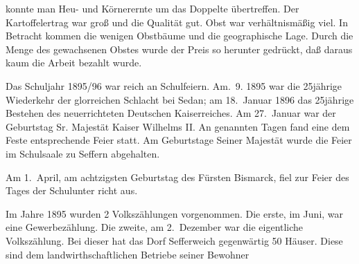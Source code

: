 

konnte man Heu- und Körnerernte um das Doppelte übertreffen.\ob
Der Kartoffelertrag war groß und die Qualität gut.\ob
Obst war verhältnismäßig viel. In Betracht kommen\ob
die wenigen Obstbäume und die geographische Lage.\ob
Durch die Menge des gewachsenen Obstes\unsicher{} wurde der\ob
Preis so herunter gedrückt, daß daraus kaum die\ob
Arbeit bezahlt wurde.

\pend
{}
\pstart

Das Schuljahr 1895/96 war reich an Schulfeiern. Am.\ 9. 1895 war die 25jährige Wiederkehr der glorreichen\ob
Schlacht bei Sedan; am 18.\ Januar 1896 das 25jährige\ob
Bestehen des neuerrichteten Deutschen Kaiserreiches.\ob
Am 27.\ Januar war der Geburtstag Sr. Majestät\ob
Kaiser Wilhelms II. An genannten Tagen fand eine\ob
dem Feste entsprechende Feier statt. Am Geburtstage\ob
Seiner Majestät wurde die Feier im Schulsaale zu\ob
Seffern abgehalten.

Am 1.\ April, am achtzigsten Geburtstag des Fürsten\ob
Bismarck, fiel zur Feier des Tages der Schulunter\ohb
richt aus.

Im Jahre 1895 wurden 2 Volkszählungen vorgenommen.\ob
Die erste, im Juni, war eine Gewerbezählung. Die\ob
zweite, am 2.\ Dezember war die eigentliche Volkszählung.\ob
Bei dieser hat das Dorf Sefferweich gegenwärtig 50 Häuser.\ob
Diese sind dem landwirthschaftlichen Betriebe seiner Bewohner
\pend
